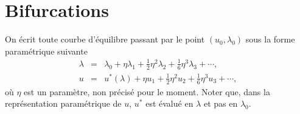 \documentclass{article}
\begin{document}
\section{Bifurcations}

On écrit toute courbe d'équilibre passant par le point $(u_0,
\lambda_0)$ sous la forme paramétrique suivante
\begin{eqnarray}
  \lambda & = & \lambda_0 + \eta \lambda_1 + \tfrac{1}{2} \eta^2 \lambda_2 +
  \tfrac{1}{6} \eta^3 \lambda_3 + \cdots,  \label{eq20211115075817}\\
  u & = & u^{\ast} (\lambda) + \eta u_1 + \tfrac{1}{2} \eta^2 u_2 +
  \tfrac{1}{6} \eta^3 u_3 + \cdots,  \label{eq20211115075835}
\end{eqnarray}
où $\eta$ est un paramètre, non précisé pour le moment. Noter
que, dans la représentation paramétrique de $u$, $u^{\ast}$ est
évalué en $\lambda$ et pas en $\lambda_0$.
\end{document}
